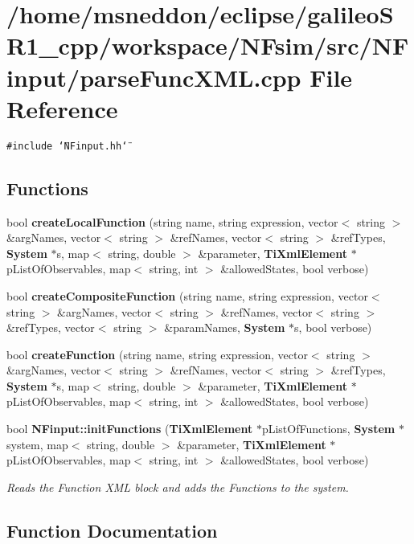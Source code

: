 \section{/home/msneddon/eclipse/galileoSR1\_\-cpp/workspace/NFsim/src/NFinput/parseFuncXML.cpp File Reference}
\label{parseFuncXML_8cpp}


{\tt \#include \char`\"{}NFinput.hh\char`\"{}}\par
\subsection*{Functions}
\begin{CompactItemize}
\item 
bool {\bf createLocalFunction} (string name, string expression, vector$<$ string $>$ \&argNames, vector$<$ string $>$ \&refNames, vector$<$ string $>$ \&refTypes, {\bf System} $\ast$s, map$<$ string, double $>$ \&parameter, {\bf TiXmlElement} $\ast$pListOfObservables, map$<$ string, int $>$ \&allowedStates, bool verbose)
\item 
bool {\bf createCompositeFunction} (string name, string expression, vector$<$ string $>$ \&argNames, vector$<$ string $>$ \&refNames, vector$<$ string $>$ \&refTypes, vector$<$ string $>$ \&paramNames, {\bf System} $\ast$s, bool verbose)
\item 
bool {\bf createFunction} (string name, string expression, vector$<$ string $>$ \&argNames, vector$<$ string $>$ \&refNames, vector$<$ string $>$ \&refTypes, {\bf System} $\ast$s, map$<$ string, double $>$ \&parameter, {\bf TiXmlElement} $\ast$pListOfObservables, map$<$ string, int $>$ \&allowedStates, bool verbose)
\item 
bool {\bf NFinput::initFunctions} ({\bf TiXmlElement} $\ast$pListOfFunctions, {\bf System} $\ast$system, map$<$ string, double $>$ \&parameter, {\bf TiXmlElement} $\ast$pListOfObservables, map$<$ string, int $>$ \&allowedStates, bool verbose)
\begin{CompactList}\small\item\em Reads the Function XML block and adds the Functions to the system. \item\end{CompactList}\end{CompactItemize}


\subsection{Function Documentation}
